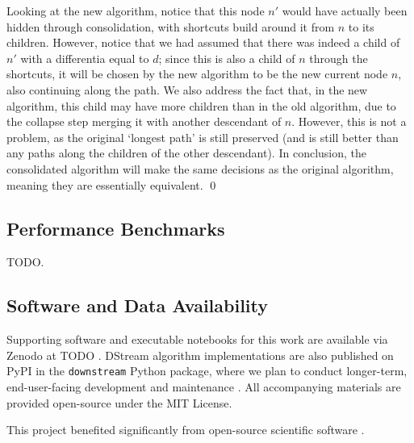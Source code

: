 Looking at the new algorithm, notice that this node $n'$ would have actually been hidden through consolidation, with shortcuts build around it from $n$ to its children. However, notice that we had assumed that there was indeed a child of $n'$ with a differentia equal to $d$; since this is also a child of $n$ through the shortcuts, it will be chosen by the new algorithm to be the new current node $n$, also continuing along the path. We also address the fact that, in the new algorithm, this child may have more children than in the old algorithm, due to the collapse step merging it with another descendant of $n$. However, this is not a problem, as the original `longest path' is still preserved (and is still better than any paths along the children of the other descendant). In conclusion, the consolidated algorithm will make the same decisions as the original algorithm, meaning they are essentially equivalent. \qed

\subsection{Performance Benchmarks}

TODO.

\subsection{Software and Data Availability} \label{sec:materials}



Supporting software and executable notebooks for this work are available via Zenodo at TODO \citep{moreno2024hsurf}.
DStream algorithm implementations are also published on PyPI in the \texttt{downstream} Python package, where we plan to conduct longer-term, end-user-facing development and maintenance \citep{moreno2024downstream}.
All accompanying materials are provided open-source under the MIT License.

This project benefited significantly from open-source scientific software \citep{2020SciPy-NMeth,harris2020array,reback2020pandas,mckinney-proc-scipy-2010,waskom2021seaborn,hunter2007matplotlib,moreno2023teeplot}.
